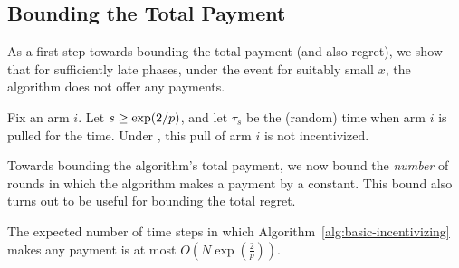 \subsection{Bounding the Total Payment}

As a first step towards bounding the total payment (and also regret),
we show that for sufficiently late phases,
under the event  for suitably small $x$,
the algorithm does not offer any payments.

\begin{lemma} \label{lem:no-incentives}
Fix an arm $i$.
Let $s \geq \exp(2/p)$, and let $\tau_s$ be the (random)
time when arm $i$ is pulled for the  time.
Under ,
this pull of arm $i$ is not incentivized.
\end{lemma}

Towards bounding the algorithm's total payment, we now bound the
\emph{number} of rounds in which the algorithm makes a payment by a
constant.
This bound also turns out to be useful for bounding the total regret.

\begin{lemma} \label{lem:numP}
The expected number of time steps in which
Algorithm~\ref{alg:basic-incentivizing}
makes any payment is at most $O\left( N\exp\left(\frac{2}{p}\right) \right)$.
\end{lemma}

